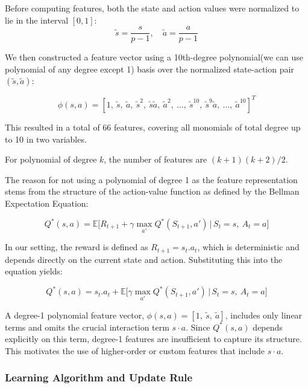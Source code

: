 \documentclass[10pt,twocolumn,letterpaper]{article}
\begin{document}
Before computing features, both the state and action values were normalized to lie in the interval $[0,1]$:
\[
\tilde{s} = \frac{s}{p - 1}, \quad \tilde{a} = \frac{a}{p - 1}
\]

We then constructed a feature vector using a 10th-degree polynomial(we can use polynomial of any degree except 1) basis over the normalized state-action pair $(\tilde{s}, \tilde{a})$:
\begin{adjustwidth}{0cm}{0cm}
    $$
    \phi(s, a) = [1,\ \tilde{s},\ \tilde{a},\ \tilde{s}^2,\ \tilde{s}\tilde{a},\ \tilde{a}^2,\ \ldots,\ \tilde{s}^{10},\ \tilde{s}^9\tilde{a},\ \ldots,\ \tilde{a}^{10}]^T
    $$
\end{adjustwidth}

This resulted in a total of 66 features, covering all monomials of total degree up to 10 in two variables.

For polynomial of degree $k$, the number of features are $(k+1)(k+2)/2$.

The reason for not using a polynomial of degree 1 as the feature representation stems from the structure of the action-value function as defined by the Bellman Expectation Equation:

\begin{adjustwidth}{0cm}{0cm}
$$
Q^*(s, a) = \mathbb{E} \big[ R_{t+1} + \gamma \max_{a'} Q^*(S_{t+1}, a') \,\big|\, S_t = s,\ A_t = a \big]
$$
\end{adjustwidth}

In our setting, the reward is defined as $R_{t+1} = s_t.a_t$, which is deterministic and depends directly on the current state and action. Substituting this into the equation yields:
\begin{adjustwidth}{-1cm}{0cm}
$$
Q^*(s, a) = s_t.a_t + \mathbb{E} [\gamma \max_{a'} Q^*(S_{t+1}, a') \,\big|\, S_t = s,\ A_t = a \big]
$$
\end{adjustwidth}

A degree-1 polynomial feature vector, \( \phi(s, a) = [1,\ \tilde{s},\ \tilde{a}] \), includes only linear terms and omits the crucial interaction term \( s \cdot a \). Since \( Q^*(s, a) \) depends explicitly on this term, degree-1 features are insufficient to capture its structure. This motivates the use of higher-order or custom features that include \( s \cdot a \).

\subsubsection*{Learning Algorithm and Update Rule}
\end{document}
